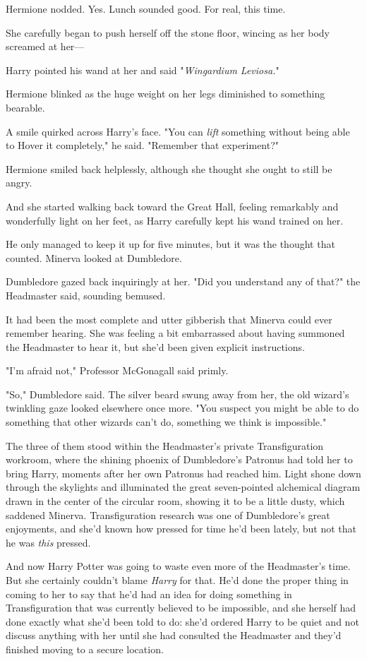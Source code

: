 Hermione nodded. Yes. Lunch sounded good. For real, this time.

She carefully began to push herself off the stone floor, wincing as her body
screamed at her---

Harry pointed his wand at her and said "\emph{Wingardium Leviosa.}"

Hermione blinked as the huge weight on her legs diminished to something
bearable.

A smile quirked across Harry's face. "You can \emph{lift} something without
being able to Hover it completely," he said. "Remember that experiment?"

Hermione smiled back helplessly, although she thought she ought to still be
angry.

And she started walking back toward the Great Hall, feeling remarkably and
wonderfully light on her feet, as Harry carefully kept his wand trained on her.

He only managed to keep it up for five minutes, but it was the thought that
counted.
\sbreak
Minerva looked at Dumbledore.

Dumbledore gazed back inquiringly at her. "Did you understand any of that?" the
Headmaster said, sounding bemused.

It had been the most complete and utter gibberish that Minerva could ever
remember hearing. She was feeling a bit embarrassed about having summoned the
Headmaster to hear it, but she'd been given explicit instructions.

"I'm afraid not," Professor McGonagall said primly.

"So," Dumbledore said. The silver beard swung away from her, the old wizard's
twinkling gaze looked elsewhere once more. "You suspect you might be able to do
something that other wizards can't do, something we think is impossible."

The three of them stood within the Headmaster's private Transfiguration
workroom, where the shining phoenix of Dumbledore's Patronus had told her to
bring Harry, moments after her own Patronus had reached him. Light shone down
through the skylights and illuminated the great seven-pointed alchemical
diagram drawn in the center of the circular room, showing it to be a little
dusty, which saddened Minerva. Transfiguration research was one of Dumbledore's
great enjoyments, and she'd known how pressed for time he'd been lately, but
not that he was \emph{this} pressed.

And now Harry Potter was going to waste even more of the Headmaster's time. But
she certainly couldn't blame \emph{Harry} for that. He'd done the proper thing
in coming to her to say that he'd had an idea for doing something in
Transfiguration that was currently believed to be impossible, and she herself
had done exactly what she'd been told to do: she'd ordered Harry to be quiet
and not discuss anything with her until she had consulted the Headmaster and
they'd finished moving to a secure location.

